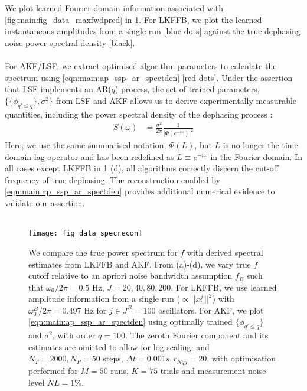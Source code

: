 \documentclass[pra, reprint]{revtex4-1}
\begin{document}
We plot learned Fourier domain information associated with \cref{fig:main:fig_data_maxfwdpred} in \cref{fig:main:fig_data_specrecon}. For LKFFB, we plot the learned instantaneous amplitudes from a single run [blue dots] against the true dephasing noise power spectral density [black]. 
\\
\\
For AKF/LSF, we extract optimised algorithm parameters to calculate the spectrum using \cref{eqn:main:ap_ssp_ar_spectden} [red dots]. Under the assertion that LSF implements an AR($q$) process, the set of trained parameters, $\{  \{\phi_{q' \leq q}\}, \sigma^2\}$ from LSF and AKF allows us to derive experimentally measurable quantities, including the power spectral density of the dephasing process \cite{brockwell1996introduction}:
\begin{align}
S(\omega) & = \frac{\sigma^2}{2 \pi }\frac{1}{|\Phi(e^{-i\omega})|^2} \label{eqn:main:ap_ssp_ar_spectden} 
\end{align}
Here, we use the same summarised notation, $\Phi(L)$, but  $L$ is no longer the time domain lag operator and has been redefined as $L \equiv e^{-i\omega}$ in the Fourier domain. In all cases except LKFFB in \cref{fig:main:fig_data_specrecon} (d), all algorithms correctly discern the cut-off frequency of true dephasing. The reconstruction enabled by \cref{eqn:main:ap_ssp_ar_spectden} provides additional numerical evidence to validate our assertion. 
\\
\\
\begin{figure}
    \texttt{[image: fig\_data\_specrecon]}
    \caption{\label{fig:main:fig_data_specrecon} We compare the true power spectrum for $f$ with derived spectral estimates from LKFFB and AKF. From (a)-(d), we vary true $f$ cutoff relative to an apriori noise bandwidth assumption $f_B$ such that $\omega_0 / 2\pi = 0.5$ Hz, $J = 20, 40, 80, 200$. For LKFFB, we use learned amplitude information from a single run ($\propto ||x^j_n||^2 $) with $\omega_0^B / 2\pi = 0.497$ Hz for $j \in J^B = 100$ oscillators. For AKF, we plot \cref{eqn:main:ap_ssp_ar_spectden} using optimally trained $\{\phi_{q' \leq q}\}$ and $\sigma^2$, with order $q = 100$. The zeroth Fourier component and its estimates are omitted to allow for log scaling; and $N_T = 2000, N_P = 50$ steps, $\Delta t = 0.001s, r_{Nqy}=20$, with optimisation performed for $M=50$ runs, $K=75$ trials and measurement noise level $NL = 1\%$.} 
\end{figure} 
\end{document}

